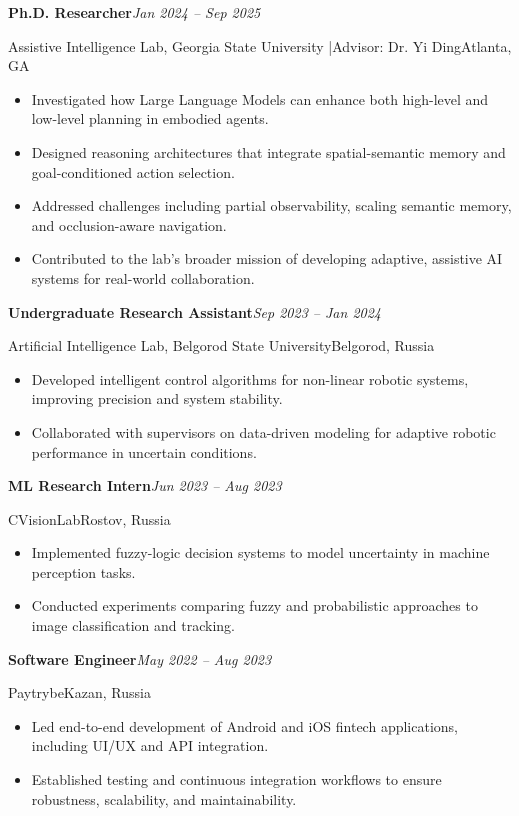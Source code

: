 \documentclass[a4paper,11pt]{article}
\newenvironment{experience}[4]
  {\noindent\textbf{\large #1}\hfill\textit{#2}\par
   \noindent\small\color{subtle}#3\hfill\color{subtle}#4\par\vspace{3pt}
   \begin{itemize}[leftmargin=1.2em,itemsep=3pt,topsep=2pt]}
  {\end{itemize}\vspace{8pt}}
\begin{document}
\begin{experience}
  {Ph.D. Researcher}{Jan 2024 -- Sep 2025}
  {Assistive Intelligence Lab, Georgia State University \enspace|\enspace Advisor: Dr. Yi Ding}{Atlanta, GA}
  \item Investigated how Large Language Models can enhance both high-level and low-level planning in embodied agents.
  \item Designed reasoning architectures that integrate spatial-semantic memory and goal-conditioned action selection.
  \item Addressed challenges including partial observability, scaling semantic memory, and occlusion-aware navigation.
  \item Contributed to the lab's broader mission of developing adaptive, assistive AI systems for real-world collaboration.
\end{experience}

\begin{experience}
  {Undergraduate Research Assistant}{Sep 2023 -- Jan 2024}
  {Artificial Intelligence Lab, Belgorod State University}{Belgorod, Russia}
  \item Developed intelligent control algorithms for non-linear robotic systems, improving precision and system stability.
  \item Collaborated with supervisors on data-driven modeling for adaptive robotic performance in uncertain conditions.
\end{experience}

\begin{experience}
  {ML Research Intern}{Jun 2023 -- Aug 2023}
  {CVisionLab}{Rostov, Russia}
  \item Implemented fuzzy-logic decision systems to model uncertainty in machine perception tasks.
  \item Conducted experiments comparing fuzzy and probabilistic approaches to image classification and tracking.
\end{experience}

\begin{experience}
  {Software Engineer}{May 2022 -- Aug 2023}
  {Paytrybe}{Kazan, Russia}
  \item Led end-to-end development of Android and iOS fintech applications, including UI/UX and API integration.
  \item Established testing and continuous integration workflows to ensure robustness, scalability, and maintainability.
\end{experience}
\end{document}

